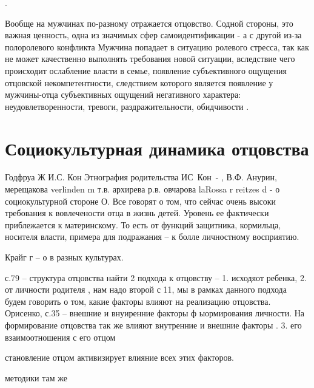 \documentclass{../../common/thesisbyxetex}
\begin{document}
.

Вообще на мужчинах по-разному отражается отцовство. Содной стороны, это важная ценность, одна из
значимых сфер самоидентификации - а с другой из-за полоролевого конфликта  Мужчина попадает в
ситуацию ролевого стресса, так как не может
качественно выполнять требования новой ситуации, вследствие чего происходит
ослабление власти в семье, появление субъективного ощущения отцовской
некомпетентности, следствием которого является появление у мужчины-отца
субъективных ощущений негативного характера: неудовлетворенности, тревоги,
раздражительности, обидчивости \cite[111]{confl}.






\section{Социокультурная динамика отцовства}



Годфруа Ж 
И.С. Кон Этнография родительства
ИС Кон -
,
В.Ф. Анурин, мерещакова verlinden m
т.в. архирева
р.в. овчарова
laRossa r reitzes d  - о социокультурной стороне О.
Все говорят о том, что сейчас очень высоки требования к вовлечености отца в жизнь детей. Уровень ее 
фактически приблежается к материнскому. То есть от функций защитника, кормильца, носителя власти, 
примера для подражания – к болле личностному восприятию.

Крайг г – о в разных культурах.



с.79 – структура отцовства
найти
2 подхода к отцовству – 1. исходяот ребенка,
2. от личности родителя \cite[11]{psyot}, нам надо второй
с 11, мы в рамках данного подхода будем говорить о том, какие факторы влияют на реализацию 
отцовства.
Орисенко, с.35 – внешние и внуиренние факторы ф ыормирования личности. На формирование отцовства так 
же влияют внутренние и внешние факторы \cite[35]{psyot}.
3. его взаимоотношения с его отцом \cite[49]{rah}


становление отцом активизирует влияние всех этих факторов.

методики там же




\printbibliography[env=gostbibliography,sorting=ntvy]
\end{document}
